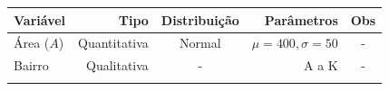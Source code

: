 \documentclass[
  a4paper, 12pt]{article}
\begin{document}
\begin{longtable}[]{@{}lrcrc@{}}
\toprule
\begin{minipage}[b]{0.18\columnwidth}\raggedright
Variável\strut
\end{minipage} & \begin{minipage}[b]{0.12\columnwidth}\raggedleft
Tipo\strut
\end{minipage} & \begin{minipage}[b]{0.11\columnwidth}\centering
Distribuição\strut
\end{minipage} & \begin{minipage}[b]{0.25\columnwidth}\raggedleft
Parâmetros\strut
\end{minipage} & \begin{minipage}[b]{0.21\columnwidth}\centering
Obs\strut
\end{minipage}\tabularnewline
\midrule
\endhead
\begin{minipage}[t]{0.18\columnwidth}\raggedright
Área (\(A\))\strut
\end{minipage} & \begin{minipage}[t]{0.12\columnwidth}\raggedleft
Quantitativa\strut
\end{minipage} & \begin{minipage}[t]{0.11\columnwidth}\centering
Normal\strut
\end{minipage} & \begin{minipage}[t]{0.25\columnwidth}\raggedleft
\(\mu = 400, \sigma = 50\)\strut
\end{minipage} & \begin{minipage}[t]{0.21\columnwidth}\centering
-\strut
\end{minipage}\tabularnewline
\begin{minipage}[t]{0.18\columnwidth}\raggedright
Bairro\strut
\end{minipage} & \begin{minipage}[t]{0.12\columnwidth}\raggedleft
Qualitativa\strut
\end{minipage} & \begin{minipage}[t]{0.11\columnwidth}\centering
-\strut
\end{minipage} & \begin{minipage}[t]{0.25\columnwidth}\raggedleft
A a K\strut
\end{minipage} & \begin{minipage}[t]{0.21\columnwidth}\centering
-\strut
\end{minipage}\tabularnewline
\begin{minipage}[t]{0.18\columnwidth}\raggedright

\end{minipage}
\end{longtable}
\end{document}
